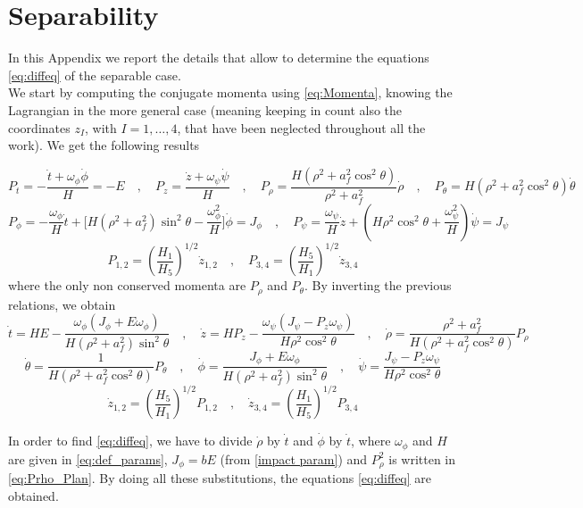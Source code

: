 \documentclass[prd,aps,a4paper,eqsecnum,nofootinbib,floatfix,twocolumn,superscriptaddress]{revtex4-2}
\begin{document}
\section{\label{APP:separability} Separability}
In this Appendix we report the details that allow to determine the equations \eqref{eq:diffeq} of the separable case.\\
We start by computing the conjugate momenta using \eqref{eq:Momenta}, knowing the Lagrangian in the more general case (meaning keeping in count also the coordinates $z_I$, with $I=1,\dots,4$, that have been neglected throughout all the work). We get the following results
\begin{widetext}
\begin{equation} \label{momenta}
P_t=-\frac{\dot{t}+\omega_\phi \dot{\phi}}{H}=-E\quad,\quad P_z=\frac{\dot{z}+\omega_\psi \dot{\psi}}{H}\quad,\quad P_\rho=\frac{H(\rho^2+a_f^2\cos^2\theta)}{\rho^2+a_f^2}\dot{\rho}\quad,\quad P_\theta=H(\rho^2+a_f^2\cos^2\theta)\dot{\theta} 
\end{equation}
$$P_\phi=-\frac{\omega_\phi}{H}\dot{t}+\Bigg[H(\rho^2+a_f^2)\sin^2\theta-\frac{\omega_\phi^2}{H}\Bigg]\dot{\phi}=J_\phi \quad,\quad P_\psi=\frac{\omega_\psi}{H}\dot{z}+\left(H\rho^2\cos^2\theta+\frac{\omega_\psi^2}{H}\right)\dot{\psi}=J_\psi$$
$$P_{1,2}=\left(\frac{H_1}{H_5}\right)^{1/2}\dot{z}_{1,2}\quad,\quad P_{3,4}=\left(\frac{H_5}{H_1}\right)^{1/2}\dot{z}_{3,4}$$
where the only non conserved momenta are $P_\rho$ and $P_\theta$. By inverting the previous relations, we obtain
\begin{equation}\label{dotxinP}
\dot{t}=H E-\frac{\omega_\phi(J_\phi +E\omega_\phi)}{H(\rho^2+a_f^2)\sin^2\theta} \quad,\quad \dot{z}=H P_z-\frac{\omega_\psi(J_\psi-P_z\omega_\psi)}{H\rho^2\cos^2\theta} \quad,\quad \dot{\rho}=\frac{\rho^2+a_f^2} {H(\rho^2+a_f^2\cos^2\theta)}P_\rho
\end{equation}
$$\dot{\theta}=\frac{1}{H(\rho^2+a_f^2\cos^2\theta)}P_\theta \quad,\quad \dot{\phi}=\frac{J_\phi+E \omega_\phi}{H(\rho^2+a_f^2)\sin^2\theta} \quad,\quad \dot{\psi}=\frac{J_\psi-P_z \omega_\psi}{ H\rho^2\cos^2\theta}$$
$$\dot{z}_{1,2}=\left(\frac{H_5}{H_1}\right)^{1/2}P_{1,2}\quad,\quad \dot{z}_{3,4}=\left(\frac{H_1}{H_5}\right)^{1/2} P_{3,4}$$
\end{widetext}
In order to find \eqref{eq:diffeq}, we have to divide $\dot{\rho}$ by $\dot{t}$ and $\dot{\phi}$ by $\dot{t}$, where $\omega_{\phi}$ and $H$ are given in \eqref{eq:def_params}, $J_\phi = b E$ (from \eqref{impact param}) and $P^2_\rho$ is written in \eqref{eq:Prho_Plan}. By doing all these substitutions, the equations \eqref{eq:diffeq} are obtained.
\end{document}
